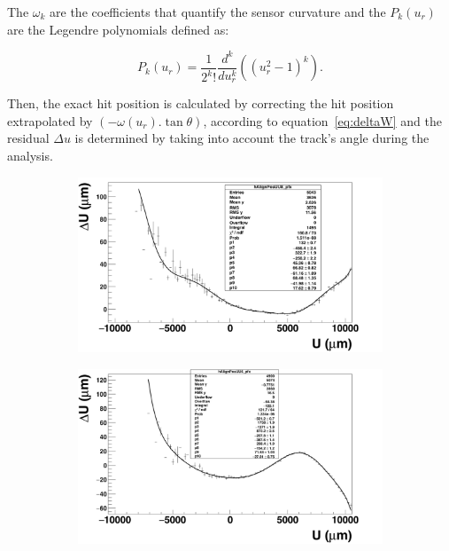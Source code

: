       The $\omega_{k}$ are the coefficients that quantify the sensor curvature and the $P_{k}(u_{r})$ are the Legendre polynomials defined as:

      \begin{equation}
        P_{k}\left(u_{r}\right) = \frac{1}{2^{k}!}\frac{d^{k}}{du_{r}^{k}} \left( (u_{r}^2 - 1)^{k}\right).
        \label{eq:Legendre}
      \end{equation}

      Then, the exact hit position is calculated by correcting the hit position extrapolated by $\left(-\omega(u_{r}).\tan{\theta}\right)$, according to equation~\ref{eq:deltaW} and the residual $\Delta u$ is determined by taking into account the track's angle during the analysis.      

      \begin{figure}[!tbh]
        \centering
        \begin{subfigure}[t]{0.45\textwidth}
          \centering
          \includegraphics[width = 1.2\textwidth]{Pictures/deformation/profileFitted_pl8.png}
          \caption{}
          \label{fig:profileFitted_front}
        \end{subfigure}
        \hfill
        \begin{subfigure}[t]{0.45\textwidth}
          \centering
          \includegraphics[width = 1.2\textwidth]{Pictures/deformation/profileFitted_pl6.png}

\end{subfigure}
\end{figure}
